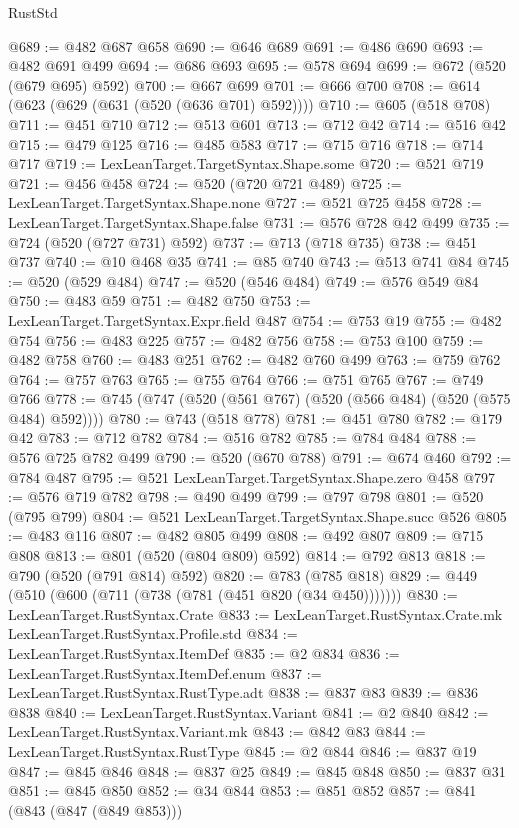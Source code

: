 \begin{lexlean}{RustStd}
\begin{coremodule}
{\begin{coremodule}
{{{{{{{{{{@689 := @482 @687 @658
@690 := @646 @689
@691 := @486 @690
@693 := @482 @691 @499
@694 := @686 @693
@695 := @578 @694
@699 := @672 (@520 (@679 @695) @592)
@700 := @667 @699
@701 := @666 @700
@708 := @614 (@623 (@629 (@631 (@520 (@636 @701) @592))))
@710 := @605 (@518 @708)
@711 := @451 @710
@712 := @513 @601
@713 := @712 @42
@714 := @516 @42
@715 := @479 @125
@716 := @485 @583
@717 := @715 @716
@718 := @714 @717
@719 := LexLeanTarget.TargetSyntax.Shape.some
@720 := @521 @719
@721 := @456 @458
@724 := @520 (@720 @721 @489)
@725 := LexLeanTarget.TargetSyntax.Shape.none
@727 := @521 @725 @458
@728 := LexLeanTarget.TargetSyntax.Shape.false
@731 := @576 @728 @42 @499
@735 := @724 (@520 (@727 @731) @592)
@737 := @713 (@718 @735)
@738 := @451 @737
@740 := @10 @468 @35
@741 := @85 @740
@743 := @513 @741 @84
@745 := @520 (@529 @484)
@747 := @520 (@546 @484)
@749 := @576 @549 @84
@750 := @483 @59
@751 := @482 @750
@753 := LexLeanTarget.TargetSyntax.Expr.field @487
@754 := @753 @19
@755 := @482 @754
@756 := @483 @225
@757 := @482 @756
@758 := @753 @100
@759 := @482 @758
@760 := @483 @251
@762 := @482 @760 @499
@763 := @759 @762
@764 := @757 @763
@765 := @755 @764
@766 := @751 @765
@767 := @749 @766
@778 := @745 (@747 (@520 (@561 @767) (@520 (@566 @484) (@520 (@575 @484) @592))))
@780 := @743 (@518 @778)
@781 := @451 @780
@782 := @179 @42
@783 := @712 @782
@784 := @516 @782
@785 := @784 @484
@788 := @576 @725 @782 @499
@790 := @520 (@670 @788)
@791 := @674 @460
@792 := @784 @487
@795 := @521 LexLeanTarget.TargetSyntax.Shape.zero @458
@797 := @576 @719 @782
@798 := @490 @499
@799 := @797 @798
@801 := @520 (@795 @799)
@804 := @521 LexLeanTarget.TargetSyntax.Shape.succ @526
@805 := @483 @116
@807 := @482 @805 @499
@808 := @492 @807
@809 := @715 @808
@813 := @801 (@520 (@804 @809) @592)
@814 := @792 @813
@818 := @790 (@520 (@791 @814) @592)
@820 := @783 (@785 @818)
@829 := @449 (@510 (@600 (@711 (@738 (@781 (@451 @820 (@34 @450)))))))
@830 := LexLeanTarget.RustSyntax.Crate
@833 := LexLeanTarget.RustSyntax.Crate.mk LexLeanTarget.RustSyntax.Profile.std
@834 := LexLeanTarget.RustSyntax.ItemDef
@835 := @2 @834
@836 := LexLeanTarget.RustSyntax.ItemDef.enum
@837 := LexLeanTarget.RustSyntax.RustType.adt
@838 := @837 @83
@839 := @836 @838
@840 := LexLeanTarget.RustSyntax.Variant
@841 := @2 @840
@842 := LexLeanTarget.RustSyntax.Variant.mk
@843 := @842 @83
@844 := LexLeanTarget.RustSyntax.RustType
@845 := @2 @844
@846 := @837 @19
@847 := @845 @846
@848 := @837 @25
@849 := @845 @848
@850 := @837 @31
@851 := @845 @850
@852 := @34 @844
@853 := @851 @852
@857 := @841 (@843 (@847 (@849 @853)))
}}}}}}}}}}
\end{coremodule}}
\end{coremodule}
\end{lexlean}
